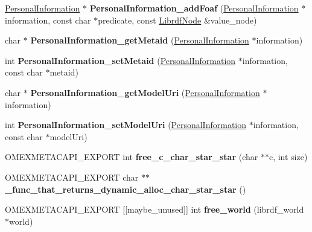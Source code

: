 \begin{DoxyCompactItemize}
\hyperlink{classomexmeta_1_1PersonalInformation}{Personal\+Information} $\ast$ {\bfseries Personal\+Information\+\_\+add\+Foaf} (\hyperlink{classomexmeta_1_1PersonalInformation}{Personal\+Information} $\ast$information, const char $\ast$predicate, const \hyperlink{classredland_1_1LibrdfNode}{Librdf\+Node} \&value\+\_\+node)
\item 
\mbox{\label{namespaceomexmeta_aba8bceb7297f33061319f06af29d14ec}} 
char $\ast$ {\bfseries Personal\+Information\+\_\+get\+Metaid} (\hyperlink{classomexmeta_1_1PersonalInformation}{Personal\+Information} $\ast$information)
\item 
\mbox{\label{namespaceomexmeta_ac71f84e1edff4f5023e02a607e9809f4}} 
int {\bfseries Personal\+Information\+\_\+set\+Metaid} (\hyperlink{classomexmeta_1_1PersonalInformation}{Personal\+Information} $\ast$information, const char $\ast$metaid)
\item 
\mbox{\label{namespaceomexmeta_a7a1a593f975f9b4c81a6f4b762eacb97}} 
char $\ast$ {\bfseries Personal\+Information\+\_\+get\+Model\+Uri} (\hyperlink{classomexmeta_1_1PersonalInformation}{Personal\+Information} $\ast$information)
\item 
\mbox{\label{namespaceomexmeta_af1b8bfaffdb6766ddaf1f52785436980}} 
int {\bfseries Personal\+Information\+\_\+set\+Model\+Uri} (\hyperlink{classomexmeta_1_1PersonalInformation}{Personal\+Information} $\ast$information, const char $\ast$model\+Uri)
\item 
\mbox{\label{namespaceomexmeta_ae46820e98812e5f7e15fba6c2fa5ea55}} 
O\+M\+E\+X\+M\+E\+T\+A\+C\+A\+P\+I\+\_\+\+E\+X\+P\+O\+RT int {\bfseries free\+\_\+c\+\_\+char\+\_\+star\+\_\+star} (char $\ast$$\ast$c, int size)
\item 
\mbox{\label{namespaceomexmeta_ada1c39e1f5456668968eabe1a0ff33ec}} 
O\+M\+E\+X\+M\+E\+T\+A\+C\+A\+P\+I\+\_\+\+E\+X\+P\+O\+RT char $\ast$$\ast$ {\bfseries \+\_\+func\+\_\+that\+\_\+returns\+\_\+dynamic\+\_\+alloc\+\_\+char\+\_\+star\+\_\+star} ()
\item 
\mbox{\label{namespaceomexmeta_a273e4922a97b016e54bbb441c23de885}} 
O\+M\+E\+X\+M\+E\+T\+A\+C\+A\+P\+I\+\_\+\+E\+X\+P\+O\+RT \mbox{[}\mbox{[}maybe\+\_\+unused\mbox{]}\mbox{]} int {\bfseries free\+\_\+world} (librdf\+\_\+world $\ast$world)

\end{DoxyCompactItemize}
